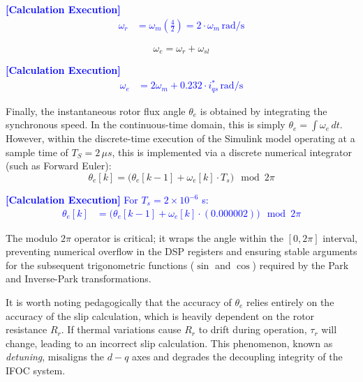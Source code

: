 \documentclass[12pt]{article}
\begin{document}
    \textcolor{blue}{\textbf{[Calculation Execution]} 
    \begin{align*}
        \omega_r &= \omega_m \left(\frac{4}{2}\right) = 2 \cdot \omega_m \, \text{rad/s}
    \end{align*}}

\begin{equation}
    \omega_e = \omega_r + \omega_{sl}
\end{equation}

    \textcolor{blue}{\textbf{[Calculation Execution]} 
    \begin{align*}
        \omega_e &= 2\omega_m + 0.232 \cdot i_{qs}^* \, \text{rad/s}
    \end{align*}}

Finally, the instantaneous rotor flux angle $\theta_e$ is obtained by integrating the synchronous speed. In the continuous-time domain, this is simply $\theta_e = \int \omega_e \, dt$. However, within the discrete-time execution of the Simulink model operating at a sample time of $ T_S = 2 \, \mu s$, this is implemented via a discrete numerical integrator (such as Forward Euler):
\begin{equation}
    \theta_e[k] = \Big( \theta_e[k-1] + \omega_e[k] \cdot T_s \Big) \mod 2\pi
\end{equation}

    \textcolor{blue}{\textbf{[Calculation Execution]} For $T_s = 2 \times 10^{-6}$ s:
    \begin{align*}
        \theta_e[k] &= \Big( \theta_e[k-1] + \omega_e[k] \cdot (0.000002) \Big) \mod 2\pi
    \end{align*}}

The modulo $2\pi$ operator is critical; it wraps the angle within the $[0, 2\pi]$ interval, preventing numerical overflow in the DSP registers and ensuring stable arguments for the subsequent trigonometric functions ($\sin$ and $\cos$) required by the Park and Inverse-Park transformations. 

It is worth noting pedagogically that the accuracy of $\theta_e$ relies entirely on the accuracy of the slip calculation, which is heavily dependent on the rotor resistance $R_r$. If thermal variations cause $R_r$ to drift during operation, $\tau_r$ will change, leading to an incorrect slip calculation. This phenomenon, known as \textit{detuning}, misaligns the $d-q$ axes and degrades the decoupling integrity of the IFOC system.
\end{document}
